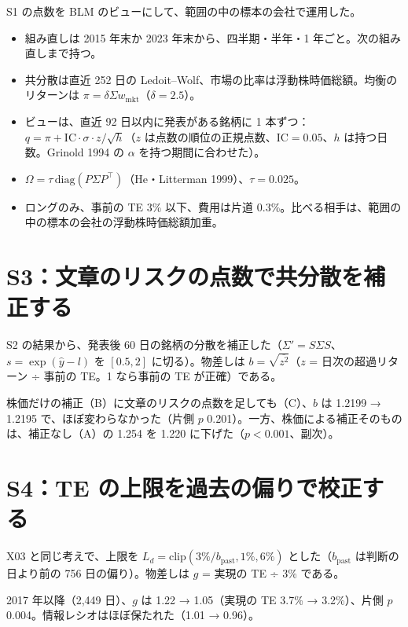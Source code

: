 \documentclass[xelatex,ja=standard,jafont=haranoaji,a4paper,10pt]{bxjsreport}
\begin{document}
S1 の点数を BLM のビューにして、範囲の中の標本の会社で運用した。

\begin{itemize}
\item 組み直しは 2015 年末か 2023 年末から、四半期・半年・1 年ごと。次の組み直しまで持つ。
\item 共分散は直近 252 日の Ledoit--Wolf、市場の比率は浮動株時価総額。均衡のリターンは $\pi = \delta\Sigma w_{\mathrm{mkt}}$（$\delta = 2.5$）。
\item ビューは、直近 92 日以内に発表がある銘柄に 1 本ずつ：$q = \pi + \mathrm{IC}\cdot\sigma\cdot z/\sqrt{h}$（$z$ は点数の順位の正規点数、$\mathrm{IC} = 0.05$、$h$ は持つ日数。Grinold 1994 の $\alpha$ を持つ期間に合わせた）。
\item $\Omega = \tau\,\mathrm{diag}(P\Sigma P^{\top})$（He・Litterman 1999）、$\tau = 0.025$。
\item ロングのみ、事前の TE 3\% 以下、費用は片道 0.3\%。比べる相手は、範囲の中の標本の会社の浮動株時価総額加重。
\end{itemize}

\section{S3：文章のリスクの点数で共分散を補正する}

S2 の結果から、発表後 60 日の銘柄の分散を補正した（$\Sigma' = S\Sigma S$、$s = \exp(\hat y - l)$ を $[0.5, 2]$ に切る）。物差しは $b = \sqrt{\overline{z^2}}$（$z$ = 日次の超過リターン ÷ 事前の TE。1 なら事前の TE が正確）である。

\begin{verdict}
株価だけの補正（B）に文章のリスクの点数を足しても（C）、$b$ は 1.2199 → 1.2195 で、ほぼ変わらなかった（片側 $p$ 0.201）。一方、株価による補正そのものは、補正なし（A）の 1.254 を 1.220 に下げた（$p < 0.001$、副次）。
\end{verdict}

\section{S4：TE の上限を過去の偏りで校正する}

X03 と同じ考えで、上限を $L_d = \mathrm{clip}(3\%/b_{\mathrm{past}}, 1\%, 6\%)$ とした（$b_{\mathrm{past}}$ は判断の日より前の 756 日の偏り）。物差しは $g$ = 実現の TE ÷ 3\% である。

\begin{verdict}
2017 年以降（2,449 日）、$g$ は 1.22 → 1.05（実現の TE 3.7\% → 3.2\%）、片側 $p$ 0.004。情報レシオはほぼ保たれた（1.01 → 0.96）。
\end{verdict}
\end{document}

